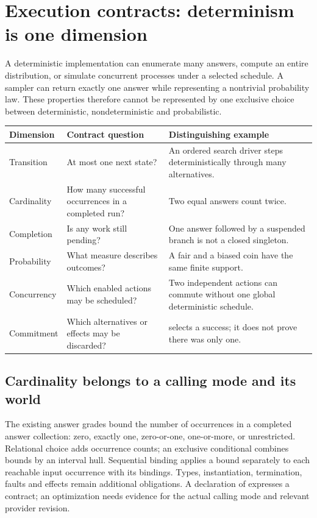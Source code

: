 \documentclass[11pt,a4paper]{article}
\newcommand{\code}[1]{\texttt{\detokenize{#1}}}
\begin{document}
\newpage
\section{Execution contracts: determinism is one dimension}
\label{sec:contracts}

A deterministic implementation can enumerate many answers, compute an entire
distribution, or simulate concurrent processes under a selected schedule.
A sampler can return exactly one answer while representing a nontrivial
probability law. These properties therefore cannot be represented by one
exclusive choice between deterministic, nondeterministic and probabilistic.

\begin{tabularx}{\linewidth}{@{}p{34mm}XX@{}}
\toprule
Dimension & Contract question & Distinguishing example \\
\midrule
Transition & At most one next state? & An ordered search driver steps
deterministically through many alternatives. \\
Cardinality & How many successful occurrences in a completed run? & Two equal
answers count twice. \\
Completion & Is any work still pending? & One answer followed by a suspended
branch is not a closed singleton. \\
Probability & What measure describes outcomes? & A fair and a biased coin
have the same finite support. \\
Concurrency & Which enabled actions may be scheduled? & Two independent
actions can commute without one global deterministic schedule. \\
Commitment & Which alternatives or effects may be discarded? & \code{once}
selects a success; it does not prove there was only one. \\
\bottomrule
\end{tabularx}

\subsection*{Cardinality belongs to a calling mode and its world}
The existing answer grades bound the number of occurrences in a completed
answer collection: zero, exactly one, zero-or-one, one-or-more, or unrestricted.
Relational choice adds occurrence counts; an exclusive conditional combines
bounds by an interval hull. Sequential binding applies a bound separately
to each reachable input occurrence with its bindings. Types, instantiation,
termination, faults and effects remain additional obligations. A declaration
of \code{det} expresses a contract; an optimization needs evidence for the
actual calling mode and relevant provider revision.
\end{document}
